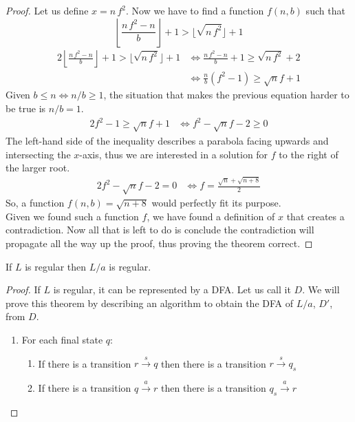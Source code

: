 \documentclass[docid=TP07]{tcom_TP}
\begin{document}
{\begin{proof}
Let us define $x=n\,f^2$. Now we have to find a function $f(n,b)$ such that
\begin{equation*}
	\left\lfloor \frac{n\,f^2-n}{b} \right\rfloor +1 > \lfloor \sqrt{n\,f^2} \rfloor +1
\end{equation*}
\begin{alignat*}{2}
	\left\lfloor \frac{n\,f^2-n}{b} \right\rfloor +1 > \lfloor \sqrt{n\,f^2} \rfloor +1
	&\iff \frac{n\,f^2-n}{b}+1 \geq \sqrt{n\,f^2} +2 \\
	&\iff \frac{n}{b}(f^2-1) \geq \sqrt{n}f + 1
\end{alignat*}
Given $b \leq n \iff n/b \geq 1$, the situation that makes the previous equation harder to be true is $n/b=1$.
\begin{alignat*}{2}
	f^2-1 \geq \sqrt{n}f + 1
	&\iff f^2-\sqrt{n}f-2 \geq 0
\end{alignat*}
The left-hand side of the inequality describes a parabola facing upwards and intersecting the $x$-axis, thus we are interested in a solution for $f$ to the right of the larger root.
 \begin{alignat*}{2}
	f^2-\sqrt{n}f-2 = 0
	&\iff f = \frac{\sqrt{n}+\sqrt{n+8}}{2}
\end{alignat*}
So, a function $f(n,b)=\sqrt{n+8}$ would perfectly fit its purpose.\\
Given we found such a function $f$, we have found a definition of $x$ that creates a contradiction. Now all that is left to do is conclude the contradiction will propagate all the way up the proof, thus proving the theorem correct.
\end{proof}
\begin{theorem}
If $L$ is regular then $L/a$ is regular.
\end{theorem}
\begin{proof}
If $L$ is regular, it can be represented by a DFA. Let us call it $D$. We will prove this theorem by describing an algorithm to obtain the DFA of $L/a$, $D'$, from $D$.
\begin{enumerate}
	\item For each final state $q$:
	\begin{enumerate}
		\item If there is a transition $r \xrightarrow{s} q$ then there is a transition $r \xrightarrow{s} q_s$
		\item If there is a transition $q \xrightarrow{a} r$ then there is a transition $q_s \xrightarrow{a} r$ 
	\end{enumerate}

\end{enumerate}
\end{proof}}
\end{document}
